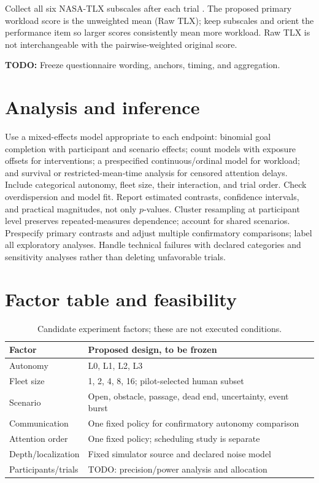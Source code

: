 \documentclass[12pt,oneside]{report}
\newcommand{\todo}[1]{\par\noindent\textcolor{red!65!black}{\textbf{TODO:} #1}\par}
\begin{document}
Collect all six NASA-TLX subscales after each trial \citep{hart1988tlx}. The proposed primary workload score is the unweighted mean (Raw TLX); keep subscales and orient the performance item so larger scores consistently mean more workload. Raw TLX is not interchangeable with the pairwise-weighted original score. \todo{Freeze questionnaire wording, anchors, timing, and aggregation.}

\section{Analysis and inference}
Use a mixed-effects model appropriate to each endpoint: binomial goal completion with participant and scenario effects; count models with exposure offsets for interventions; a prespecified continuous/ordinal model for workload; and survival or restricted-mean-time analysis for censored attention delays. Include categorical autonomy, fleet size, their interaction, and trial order. Check overdispersion and model fit. Report estimated contrasts, confidence intervals, and practical magnitudes, not only $p$-values. Cluster resampling at participant level preserves repeated-measures dependence; account for shared scenarios. Prespecify primary contrasts and adjust multiple confirmatory comparisons; label all exploratory analyses. Handle technical failures with declared categories and sensitivity analyses rather than deleting unfavorable trials.

\section{Factor table and feasibility}
\begin{table}[htbp]\centering\begin{tabular}{p{.28\linewidth}p{.58\linewidth}}\toprule
Factor & Proposed design, to be frozen \\\midrule
Autonomy & L0, L1, L2, L3 \\
Fleet size & 1, 2, 4, 8, 16; pilot-selected human subset \\
Scenario & Open, obstacle, passage, dead end, uncertainty, event burst \\
Communication & One fixed policy for confirmatory autonomy comparison \\
Attention order & One fixed policy; scheduling study is separate \\
Depth/localization & Fixed simulator source and declared noise model \\
Participants/trials & TODO: precision/power analysis and allocation \\\bottomrule\end{tabular}\caption{Candidate experiment factors; these are not executed conditions.}\end{table}
\end{document}
